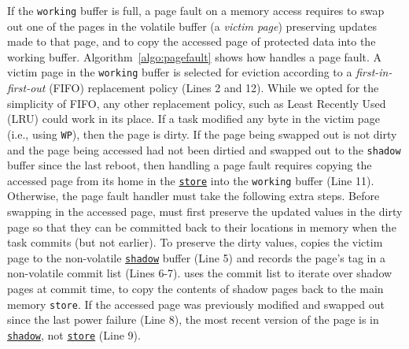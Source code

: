 If the \texttt{working} buffer is full, a page fault on a memory access
requires \sys to swap out one of the pages in the volatile buffer (a 
\emph{victim page}) preserving updates made to that page, and to copy the
accessed page of protected data into the working buffer.
Algorithm~\ref{algo:pagefault} shows how \sys handles a page fault. A victim
page in the \texttt{working} buffer is selected for eviction according to
a \emph{first-in-first-out} (FIFO) replacement policy (Lines 2 and 12). 
%
While we opted for the simplicity of FIFO, any other replacement policy, such
as Least Recently Used (LRU) could work in its place.
%
If a task modified any byte in the victim page (i.e., using \texttt{WP}), then
the page is dirty.  If the page being swapped out is not dirty and the page
being accessed had not been dirtied and swapped out to the \texttt{shadow}
buffer since the last reboot, then handling a page fault requires copying the
accessed page from its home in the  \texttt{\underline{store}} into the
\texttt{working} buffer (Line 11).  Otherwise, the page fault handler must take
the following extra steps.
%
Before swapping in the accessed page, \sys must first preserve the updated
values in the dirty page so that they can be committed back to their locations
in memory when the task commits (but not earlier).  To preserve the dirty
values, \sys copies the victim page to the non-volatile
\texttt{\underline{shadow}} buffer (Line 5) and records the page's tag in a
non-volatile commit list (Lines 6-7). \sys uses the commit list to iterate over shadow pages 
at commit time, to copy the contents of shadow pages back to the main memory {\tt store}. 
%
%
If the accessed page was previously modified and swapped out since the last
power failure (Line 8), the most recent version of the page is in {\tt
\underline{shadow}}, not \texttt{\underline{store}} (Line 9).



